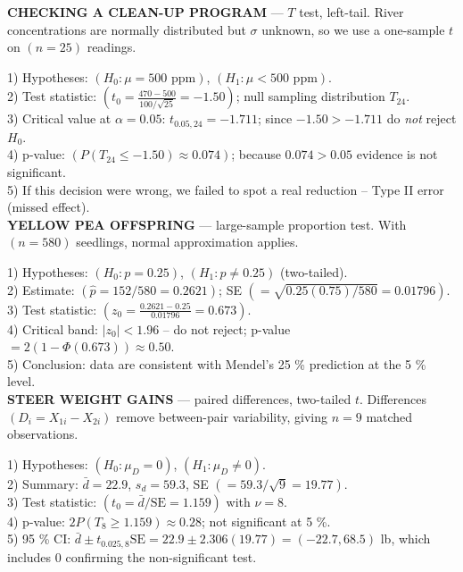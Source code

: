 \documentclass[landscape,0.4pt]{article}
\begin{document}
\begin{multicols*}{6}
\textbf{\tiny{CHECKING A CLEAN-UP PROGRAM}} — $T$ test, left-tail.  
River concentrations are normally distributed but $\sigma$ unknown, so we use a one-sample $t$ on $(n=25)$ readings.

1) Hypotheses: $(H_0:\mu=500\text{ ppm})$, $(H_1:\mu<500\text{ ppm})$.\\
2) Test statistic: $(t_0=\tfrac{470-500}{100/\sqrt{25}}=-1.50)$; null sampling distribution $T_{24}$.\\
3) Critical value at $\alpha=0.05$: $t_{0.05,24}=-1.711$; since $-1.50>-1.711$ do \emph{not} reject $H_0$.\\
4) p-value: $(P(T_{24}\le-1.50)\approx0.074)$; because $0.074>0.05$ evidence is not significant.\\
5) If this decision were wrong, we failed to spot a real reduction -- Type II error (missed effect).\\[-2pt]


\textbf{\tiny{YELLOW PEA OFFSPRING}} — large-sample proportion test.  
With $(n=580)$ seedlings, normal approximation applies.

1) Hypotheses: $(H_0:p=0.25)$, $(H_1:p\neq0.25)$ (two-tailed).\\
2) Estimate: $(\hat{p}=152/580=0.2621)$; SE $(=\sqrt{0.25(0.75)/580}=0.01796)$.\\
3) Test statistic: $(z_0=\tfrac{0.2621-0.25}{0.01796}=0.673)$.\\
4) Critical band: $|z_0|<1.96$ -- do not reject; p-value $=2(1-\Phi(0.673))\approx0.50$.\\
5) Conclusion: data are consistent with Mendel’s 25 \% prediction at the 5 \% level.\\[-2pt]


\textbf{\tiny{STEER WEIGHT GAINS}} — paired differences, two-tailed $t$.  
Differences $(D_i=X_{1i}-X_{2i})$ remove between-pair variability, giving $n=9$ matched observations.

1) Hypotheses: $(H_0:\mu_D=0)$, $(H_1:\mu_D\neq0)$.\\
2) Summary: $\bar{d}=22.9$, $s_d=59.3$, SE $(=59.3/\sqrt{9}=19.77)$.\\
3) Test statistic: $(t_0=\bar{d}/\text{SE}=1.159)$ with $\nu=8$.\\
4) p-value: $2P(T_8\ge1.159)\approx0.28$; not significant at 5 \%.\\
5) 95 \% CI: $\bar{d}\pm t_{0.025,8}\text{SE}=22.9\pm2.306(19.77)=(-22.7,68.5)$ lb, which includes $0$ confirming the non-significant test.\\[-2pt]



\end{multicols*}
\end{document}
